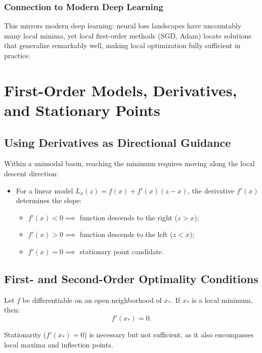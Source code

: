 \subsubsection{Connection to Modern Deep Learning}
This mirrors modern deep learning: neural loss landscapes have uncountably many local minima, yet local first-order methods (SGD, Adam) locate solutions that generalize remarkably well, making local optimization fully sufficient in practice.

\FloatBarrier
\section[First-Order Models, Derivatives, and Stationary Points]{First-Order Models, Derivatives,\\and Stationary Points}
\label{sec:univariate-first-order-models-en}

\subsection{Using Derivatives as Directional Guidance}
Within a unimodal basin, reaching the minimum requires moving along the local descent direction:
\begin{itemize}
    \item For a linear model $L_x(z) = f(x) + f'(x)(z - x)$, the derivative $f'(x)$ determines the slope:
    \begin{itemize}
        \item $f'(x) < 0 \implies$ function descends to the right ($z > x$);
        \item $f'(x) > 0 \implies$ function descends to the left ($z < x$);
        \item $f'(x) = 0 \implies$ stationary point candidate.
    \end{itemize}
\end{itemize}

\subsection{First- and Second-Order Optimality Conditions}
\begin{theorem}
Let $f$ be differentiable on an open neighborhood of $x_*$. If $x_*$ is a local minimum, then:
\begin{equation}
    f'(x_*) = 0.
\end{equation}
\end{theorem}
Stationarity ($f'(x_*) = 0$) is necessary but not sufficient, as it also encompasses local maxima and inflection points.

